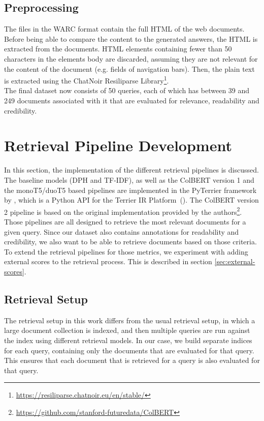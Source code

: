 \subsection{Preprocessing}
The files in the WARC format contain the full HTML of the web documents.
Before being able to compare the content to the generated answers, the HTML is extracted from the documents.
HTML elements containing fewer than 50 characters in the elements body are discarded, assuming they are not relevant for the content of the document (e.g. fields of navigation bars).
Then, the plain text is extracted using the ChatNoir Resiliparse Library\footnote{\url{https://resiliparse.chatnoir.eu/en/stable/}}.
\\
The final dataset now consists of 50 queries, each of which has between 39 and 249 documents associated with it that are evaluated for relevance, readability and credibility.


\section{Retrieval Pipeline Development}
In this section, the implementation of the different retrieval pipelines is discussed.
The baseline models (DPH and TF-IDF), as well as the ColBERT version 1 and the monoT5/duoT5 based pipelines are implemented in the PyTerrier framework by \cite{pyterrier:2020:Declarative}, which is a Python API for the Terrier IR Platform~(\cite{macdonald:2012:From}).
The ColBERT version 2 pipeline is based on the original implementation provided by the authors\footnote{\url{https://github.com/stanford-futuredata/ColBERT}}.
\\
Those pipelines are all designed to retrieve the most relevant documents for a given query.
Since our dataset also contains annotations for readability and credibility, we also want to be able to retrieve documents based on those criteria.
To extend the retrieval pipelines for those metrics, we experiment with adding external scores to the retrieval process.
This is described in section \ref{sec:external-scores}.
\\

\subsection{Retrieval Setup}
The retrieval setup in this work differs from the usual retrieval setup, in which a large document collection is indexed, and then multiple queries are run against the index using different retrieval models.
In our case, we build separate indices for each query, containing only the documents that are evaluated for that query.
This ensures that each document that is retrieved for a query is also evaluated for that query.


